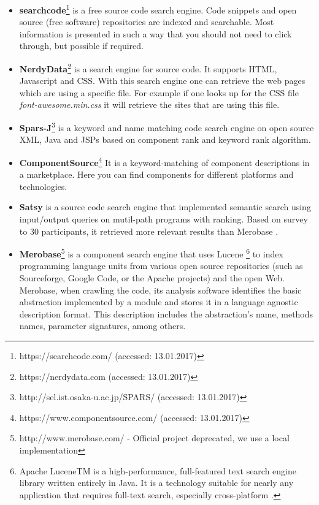 \begin{itemize}
\item \textbf{searchcode}\footnote{https://searchcode.com/ (accessed: 13.01.2017)} is a free source code search engine. Code snippets and open source (free software) repositories are indexed and searchable. Most information is presented in such a way that you should not need to click through, but possible if required.
\item \textbf{NerdyData}\footnote{https://nerdydata.com (accessed: 13.01.2017)} is a search engine for source code. It supports HTML, Javascript and CSS. With this search engine one can retrieve the web pages which are using a specific file. For example if one looks up for the CSS file \textit{font-awesome.min.css} it will retrieve the sites that are using this file.
\item \textbf{Spars-J}\footnote{http://sel.ist.osaka-u.ac.jp/SPARS/ (accessed: 13.01.2017)} is a keyword and name matching code search engine on open source XML, Java and JSPs based on component rank and keyword rank algorithm.
\item \textbf{ComponentSource}\footnote{https://www.componentsource.com/ (accessed: 13.01.2017)} It is a keyword-matching of component descriptions in a marketplace. Here you can find components for different platforms and technologies.
\item \textbf{Satsy} is a source code search engine that implemented semantic search using input/output queries on mutil-path programs with ranking. Based on survey to 30 participants, it retrieved more relevant results than Merobase \cite{Stolee2016}.
\item \textbf{Merobase}\footnote{http://www.merobase.com/ - Official project deprecated, we use a local implementation} is a component search engine that uses Lucene \footnote{Apache LuceneTM is a high-performance, full-featured text search engine library written entirely in Java. It is a technology suitable for nearly any application that requires full-text search, especially cross-platform \cite{lucene}.} to index programming language units from various open source repositories (such as Sourceforge, Google Code, or the Apache projects) and the open Web. Merobase, when crawling the code, its analysis software identifies the basic abstraction implemented by a module and stores it in a language agnostic description format. This description includes the abstraction's name, methods names, parameter signatures, among others.
\end{itemize}

